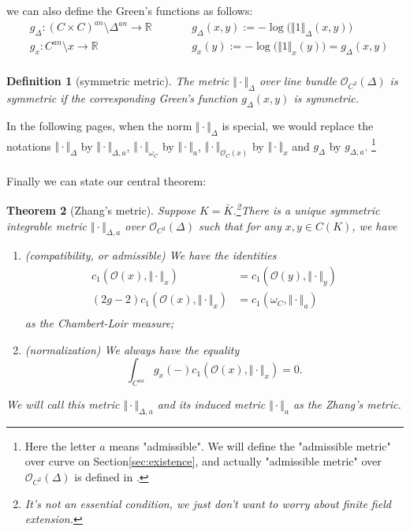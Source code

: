 \documentclass[reqno,11pt]{amsart}
\numberwithin{equation}{section}
\theoremstyle{plain}
\newtheorem{theorem}{Theorem}[section]
\newtheorem{defn}[theorem]{Definition}
\theoremstyle{plain}
\numberwithin{equation}{section}
\theoremstyle{remark}
\newcommand{\norm}[1]{\Vert{#1}\Vert}
\begin{document}
we can also define the Green's functions as follows:
\begin{equation*}
\begin{aligned}
 &g_{\Delta}:(C \times C)^{an} \setminus \Delta^{an} \longrightarrow \mathbb{R} \qquad  &&g_{\Delta}(x,y):=-\log \big(\norm{1}_{\Delta}(x,y)\big)  \\
 &g_{x}:C^{an} \setminus {x} \longrightarrow \mathbb{R} \qquad  &&g_{x}(y):=-\log \big(\norm{1}_{x}(y)\big) =g_{\Delta}(x,y) \\
\end{aligned}
\end{equation*}
\begin{defn}[symmetric metric]
The metric $\norm{\cdot}_{\Delta}$ over line bundle $\mathcal{O}_{C^2}(\Delta)$ is symmetric if the corresponding Green's function $g_{\Delta}(x,y)$ is symmetric.
\end{defn}
In the following pages, when the norm  $\norm{\cdot}_{\Delta}$ is special, we would replace the notations $\norm{\cdot}_{\Delta}$ by $\norm{\cdot}_{\Delta,a}$, $\norm{\cdot}_{\omega_C}$ by $\norm{\cdot}_{a}$, $\norm{\cdot}_{\mathcal{O}_C(x)}$ by $\norm{\cdot}_{x}$ and $g_{\Delta}$ by $g_{\Delta,a}$. \footnote{Here the letter $a$ means "admissible". We will define the "admissible metric" over curve on Section\ref{sec:existence}, and actually "admissible metric" over $\mathcal{O}_{C^2}(\Delta)$ is defined in \cite[Appendix A.3, p79]{yuan2021arithmetic}.}
\\
\\

Finally we can state our central theorem:
\begin{theorem}[Zhang's metric]\label{thm:main}
Suppose $K=\bar{K}$.\footnote{It's not an essential condition, we just don't want to worry about finite field extension.}There is a unique symmetric integrable metric $\norm{\cdot}_{\Delta,a}$ over $\mathcal{O}_{C^2}(\Delta)$ such that for any $x,y \in C(K)$, we have
\begin{enumerate}[(1)]
\item (compatibility, or admissible) We have the identities
\begin{equation*}
\begin{aligned}
  c_1(\mathcal{O}(x),\norm{\cdot}_x)&=c_1(\mathcal{O}(y),\norm{\cdot}_y)  \\ 
  (2g-2)c_1(\mathcal{O}(x),\norm{\cdot}_x)&=c_1(\omega_C,\norm{\cdot}_a)  \\ 
\end{aligned}
\end{equation*}
as the Chambert-Loir measure;
\item (normalization) We always have the equality
$$\int_{C^{an}} g_x(-) c_1(\mathcal{O}(x),\norm{\cdot}_x) =0.$$
\end{enumerate}
We will call this metric $\norm{\cdot}_{\Delta,a}$ and its induced metric $\norm{\cdot}_{a}$ as the Zhang's metric.
\end{theorem}
\end{document}
